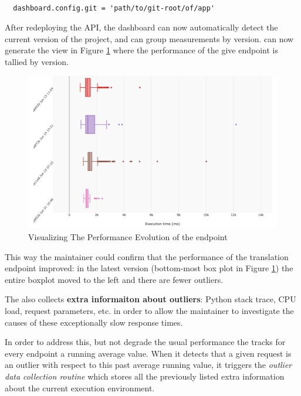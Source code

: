 \documentclass[conference]{IEEEtran}
\begin{document}
  \begin{lstlisting}[caption=Configuring the \tool with the path to the .git folder enables the generation of evolutionary performance graphs, style=custompython]

  dashboard.config.git = 'path/to/git-root/of/app'

  \end{lstlisting}

  After redeploying the API, the dashboard can now automatically detect the current version of the project, and can group measurements by version. \tool can now generate the view in Figure \ref{fig:tee} where the performance of the give endpoint is tallied by version.

  \begin{figure}[h!]
    \centering
    \includegraphics[width=\linewidth]{translation_endpoint_evolution.png}
    \caption{Visualizing The Performance Evolution of the \epTranslations endpoint}
    \label{fig:tee}
  \end{figure}

  This way the maintainer could confirm that the performance of the translation endpoint improved: in the latest version (bottom-most box plot in Figure \ref{fig:tee}) the entire boxplot moved to the left and there are fewer outliers.


  \niceseparator

  The \tool also collects {\bf extra informaiton about outliers}: Python stack trace, CPU load, request parameters, etc. in order to allow the maintainer to investigate the causes of these exceptionally slow response times. 

  In order to address this, but not degrade the usual performance the \tool tracks for every endpoint a running average value. When it detects that a given request is an outlier with respect to this past average running value, it triggers the {\em outlier data collection routine} which stores all the previously listed extra information about the current execution environment. 
\end{document}
